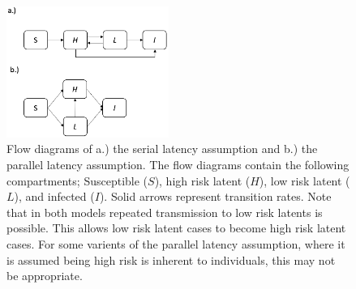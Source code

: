 \documentclass[11pt,twoside]{bristolthesis}
\begin{document}
  \begin{figure}
  
  {\centering \includegraphics[width=200px,]{chapters/model-development/resources/model_diagrams/latency_flow} 
  
  }
  
  \caption[Flow diagrams of a.) the serial latency assumption and b.) the parallel latency assumption.]{Flow diagrams of a.) the serial latency assumption and b.) the parallel latency assumption. The flow diagrams contain the following compartments; Susceptible ($S$), high risk latent ($H$), low risk latent ($L$), and infected ($I$). Solid arrows represent transition rates. Note that in both models repeated transmission to low risk latents is possible. This allows low risk latent cases to become high risk latent cases. For some varients of the parallel latency assumption, where it is assumed being high risk is inherent to individuals, this may not be appropriate.}\label{fig:latency-flow-diag}
  \end{figure}
\end{document}
